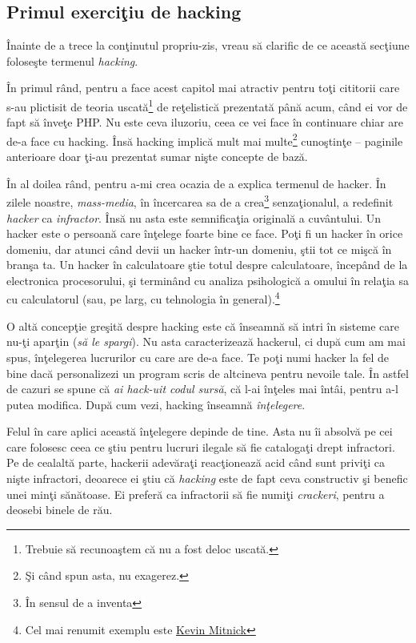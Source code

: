 \subsection{Primul exerciţiu de hacking}

Înainte de a trece la conţinutul propriu-zis, vreau să clarific de ce această secţiune
foloseşte termenul \textsl{hacking}.

În primul rând, pentru a face acest capitol mai
atractiv pentru toţi cititorii care s-au plictisit de teoria uscată\footnote{Trebuie să
recunoaştem că nu a fost deloc uscată.} de reţelistică
prezentată până acum,
când ei vor de fapt să înveţe PHP. Nu este ceva iluzoriu, ceea ce vei face în continuare
chiar are de-a face cu hacking. Însă hacking implică mult mai multe\footnote{Şi când
spun asta, nu exagerez.}
 cunoştinţe -- paginile
anterioare doar ţi-au prezentat sumar nişte concepte de bază.

În al doilea rând, pentru a-mi crea ocazia de a explica termenul de hacker.
În zilele noastre, \textsl{mass-media}, în încercarea sa de a crea\footnote{În
sensul de {\glqq}a inventa{\grqq}} senzaţionalul,
a redefinit \textsl{hacker} ca \textit{infractor}. Însă nu asta este semnificaţia
originală a cuvântului. Un hacker este o persoană care înţelege foarte bine ce
face. Poţi fi un hacker în orice domeniu, dar atunci când devii un hacker într-un domeniu,
ştii tot ce mişcă în branşa ta. Un hacker în calculatoare ştie totul despre calculatoare,
începând de la electronica procesorului, şi terminând cu analiza psihologică a
omului în relaţia sa cu
calculatorul (sau, pe larg, cu tehnologia în general).\footnote{Cel mai renumit exemplu este
\href{http://en.wikipedia.org/wiki/Kevin_Mitnick}{Kevin Mitnick}}

O altă concepţie greşită despre hacking este că înseamnă să intri în sisteme care nu-ţi
aparţin (\textit{să le spargi}). Nu asta caracterizează hackerul, ci după cum am mai spus,
înţelegerea lucrurilor cu care are de-a face. Te poţi numi hacker la fel de bine
dacă personalizezi un program scris de altcineva pentru nevoile tale. În astfel
de cazuri se spune că \textsl{ai hack-uit codul sursă}, că l-ai înţeles mai întâi, pentru
a-l putea modifica. După cum vezi, hacking înseamnă \textit{înţelegere}.

Felul în care aplici această înţelegere depinde de tine. Asta nu îi absolvă pe
cei care folosesc ceea ce ştiu pentru lucruri ilegale să fie catalogaţi
drept infractori. Pe de cealaltă parte, hackerii adevăraţi reacţionează acid
când sunt priviţi ca nişte infractori, deoarece ei
ştiu că \textsl{hacking} este de fapt ceva constructiv şi benefic unei minţi sănătoase.
Ei preferă ca infractorii să fie numiţi \textsl{crackeri}, pentru a deosebi binele
de rău.


